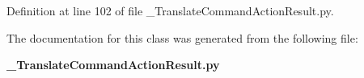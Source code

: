 \subsubsection[{status}]{}\label{classoryx__drive__controller_1_1msg_1_1__TranslateCommandActionResult_1_1TranslateCommandActionResult_a06039e152ce85df30635dc3ee7fc259d}


\-Definition at line 102 of file \-\_\-\-Translate\-Command\-Action\-Result.\-py.



\-The documentation for this class was generated from the following file\-:\begin{DoxyCompactItemize}
\item 
{\bf \-\_\-\-Translate\-Command\-Action\-Result.\-py}\end{DoxyCompactItemize}
